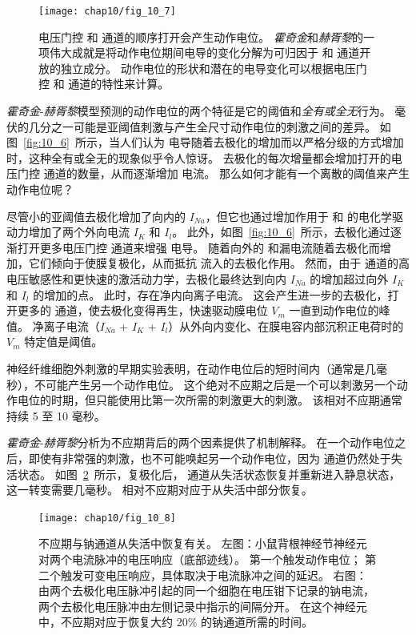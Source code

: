 \begin{figure}[htbp]
	\centering
	\texttt{[image: chap10/fig\_10\_7]}
	\caption{电压门控  和  通道的顺序打开会产生动作电位。
		\textit{霍奇金}和\textit{赫胥黎}的一项伟大成就是将动作电位期间电导的变化分解为可归因于  和  通道开放的独立成分。
		动作电位的形状和潜在的电导变化可以根据电压门控  和  通道的特性来计算\cite{hille1978ionic}。}
	\label{fig:10_7}
\end{figure}


\textit{霍奇金}-\textit{赫胥黎}模型预测的动作电位的两个特征是它的阈值和\textit{全有或全无}行为。
毫伏的几分之一可能是亚阈值刺激与产生全尺寸动作电位的刺激之间的差异。
如图~\ref{fig:10_6}~所示，当人们认为  电导随着去极化的增加而以严格分级的方式增加时，这种全有或全无的现象似乎令人惊讶。 
去极化的每次增量都会增加打开的电压门控  通道的数量，从而逐渐增加  电流。
那么如何才能有一个离散的阈值来产生动作电位呢？


尽管小的亚阈值去极化增加了向内的 $I_{Na}$，但它也通过增加作用于  和  的电化学驱动力增加了两个外向电流 $I_K$ 和 $I_l$。
此外，如图~\ref{fig:10_6}~所示，去极化通过逐渐打开更多电压门控  通道来增强  电导。
随着向外的  和漏电流随着去极化而增加，它们倾向于使膜复极化，从而抵抗  流入的去极化作用。
然而，由于  通道的高电压敏感性和更快速的激活动力学，去极化最终达到向内 $I_{Na}$ 的增加超过向外 $I_K$ 和 $I_l$ 的增加的点。
此时，存在净内向离子电流。
这会产生进一步的去极化，打开更多的  通道，使去极化变得再生，快速驱动膜电位 $V_m$ 一直到动作电位的峰值。
净离子电流（$I_{Na}$ + $I_K$ + $I_l$）从外向内变化、在膜电容内部沉积正电荷时的 $V_m$ 特定值是阈值。


神经纤维细胞外刺激的早期实验表明，在动作电位后的短时间内（通常是几毫秒），不可能产生另一个动作电位。 
这个绝对不应期之后是一个可以刺激另一个动作电位的时期，但只能使用比第一次所需的刺激更大的刺激。 
该相对不应期通常持续 5 至 10 毫秒。


\textit{霍奇金}-\textit{赫胥黎}分析为不应期背后的两个因素提供了机制解释。
在一个动作电位之后，即使有非常强的刺激，也不可能唤起另一个动作电位，因为  通道仍然处于失活状态。
如图~\ref{fig:10_8}~所示，复极化后， 通道从失活状态恢复并重新进入静息状态，这一转变需要几毫秒。
相对不应期对应于从失活中部分恢复。


\begin{figure}[htbp]
	\centering
	\texttt{[image: chap10/fig\_10\_8]}
	\caption{不应期与钠通道从失活中恢复有关。
		左图：小鼠背根神经节神经元对两个电流脉冲的电压响应（底部迹线）。
		第一个触发动作电位；
		第二个触发可变电压响应，具体取决于电流脉冲之间的延迟。
		右图：由两个去极化电压脉冲引起的同一个细胞在电压钳下记录的钠电流，两个去极化电压脉冲由左侧记录中指示的间隔分开。
		在这个神经元中，不应期对应于恢复大约 20\% 的钠通道所需的时间。}
	\label{fig:10_8}
\end{figure}


